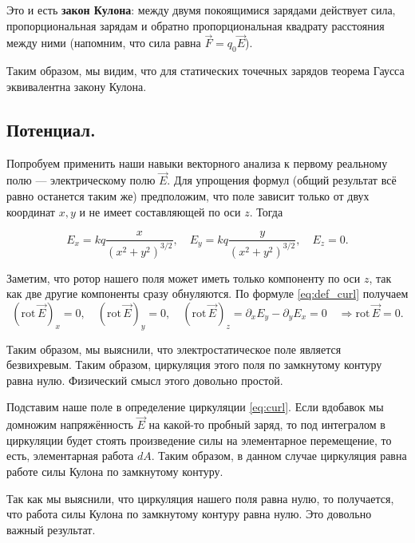 \documentclass[11pt,a4paper]{article}
\numberwithin{equation}{section}
\newcommand{\pt}{\partial}
\newcommand{\rot}{\mathrm{rot}\,}
\begin{document}
Это и есть \textbf{закон Кулона}: между двумя покоящимися зарядами
действует сила, пропорциональная зарядам и обратно пропорциональная
квадрату расстояния между ними (напомним, что сила равна $\vec{F} = q_0
\vec{E}$).

Таким образом, мы видим, что для статических точечных зарядов теорема
Гаусса эквивалентна закону Кулона. 

\subsection{Потенциал.}
\label{sec:potential}

Попробуем применить наши навыки векторного анализа к первому реальному
полю --- электрическому полю $\vec{E}$. Для упрощения формул (общий
результат всё равно останется таким же) предположим, что поле зависит
только от двух координат $x,y$ и не имеет составляющей по оси
$z$. Тогда

\begin{equation}
  \label{eq:rot_electrostatics_1}
  E_x = kq \frac{x}{(x^2+y^2)^{3/2}}, \quad   E_y = kq
  \frac{y}{(x^2+y^2)^{3/2}}, \quad E_z =0. 
\end{equation}

Заметим, что ротор нашего поля может иметь только компоненту по оси
$z$, так как две другие компоненты сразу обнуляются. По формуле
\eqref{eq:def_curl} получаем
\begin{equation}
  \label{eq:rot_electrostatics_2}
 \left( \rot \vec{E} \right)_x =0, \quad  \left( \rot \vec{E}
 \right)_y =0, \quad \left( \rot \vec{E} \right)_z = \pt_x E_y - \pt_y
 E_x = 0 \quad \Rightarrow \rot \vec{E} =0.
\end{equation}

Таким образом, мы выяснили, что электростатическое поле является
безвихревым. Таким образом, циркуляция этого поля по замкнутому
контуру равна нулю. Физический смысл этого довольно простой. 

Подставим наше поле в определение циркуляции \eqref{eq:curl}. Если
вдобавок мы домножим напряжённость $\vec{E}$ на какой-то пробный
заряд, то под интегралом в циркуляции будет стоять произведение силы
на элементарное перемещение, то есть, элементарная работа $dA$. Таким
образом, в данном случае циркуляция равна работе силы Кулона по
замкнутому контуру. 

Так как мы выяснили, что циркуляция нашего поля равна нулю, то
получается, что работа силы Кулона по замкнутому контуру равна
нулю. Это довольно важный результат. 
\end{document}
